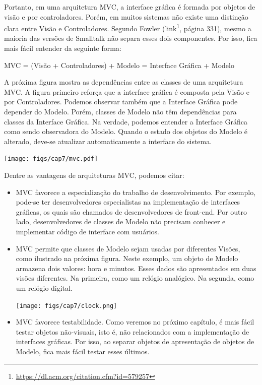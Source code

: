 \documentclass[
  11pt,
  twoside]{book}
\DeclareRobustCommand{\href}[2]{#2\footnote{\url{#1}}}
\let\origfigure\figure
\let\endorigfigure\endfigure
\renewenvironment{figure}[1][2] {
    \expandafter\origfigure\expandafter[!h]
} {
    \endorigfigure
}
\begin{document}
Portanto, em uma arquitetura MVC, a interface gráfica é formada por
objetos de visão e por controladores. Porém, em muitos sistemas não
existe uma distinção clara entre Visão e Controladores. Segundo Fowler
(\href{https://dl.acm.org/citation.cfm?id=579257}{link}, página 331),
mesmo a maioria das versões de Smalltalk não separa esses dois
componentes. Por isso, fica mais fácil entender da seguinte forma:

MVC = (Visão + Controladores) + Modelo = Interface Gráfica + Modelo

A próxima figura mostra as dependências entre as classes de uma
arquitetura MVC. A figura primeiro reforça que a interface gráfica é
composta pela Visão e por Controladores. Podemos observar também que a
Interface Gráfica pode depender do Modelo. Porém, classes de Modelo não
têm dependências para classes da Interface Gráfica. Na verdade, podemos
entender a Interface Gráfica como sendo observadora do Modelo. Quando o
estado dos objetos do Modelo é alterado, deve-se atualizar
automaticamente a interface do sistema.

\begin{figure}
\centering
\texttt{[image: figs/cap7/mvc.pdf]}
\caption{Arquitetura MVC}
\end{figure}

Dentre as vantagens de arquiteturas MVC, podemos citar:

\begin{itemize}
\item
  MVC favorece a especialização do trabalho de desenvolvimento. Por
  exemplo, pode-se ter desenvolvedores especialistas na implementação de
  interfaces gráficas, os quais são chamados de desenvolvedores de
  front-end. Por outro lado, desenvolvedores de classes de Modelo não
  precisam conhecer e implementar código de interface com usuários.
\item
  MVC permite que classes de Modelo sejam usadas por diferentes Visões,
  como ilustrado na próxima figura. Neste exemplo, um objeto de Modelo
  armazena dois valores: hora e minutos. Esses dados são apresentados em
  duas visões diferentes. Na primeira, como um relógio analógico. Na
  segunda, como um relógio digital.

  \begin{figure}
  \centering
  \texttt{[image: figs/cap7/clock.png]}
  \caption{Sistema MVC com mais de uma visão (interface gráfica)}
  \end{figure}
\item
  MVC favorece testabilidade. Como veremos no próximo capítulo, é mais
  fácil testar objetos não-visuais, isto é, não relacionados com a
  implementação de interfaces gráficas. Por isso, ao separar objetos de
  apresentação de objetos de Modelo, fica mais fácil testar esses
  últimos.
\end{itemize}
\end{document}
